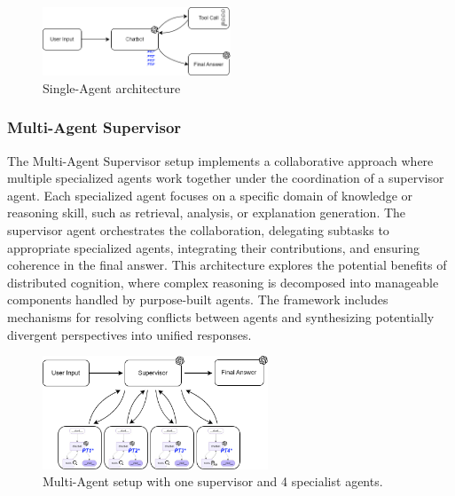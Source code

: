                 \begin{figure}[h]
                    \centering
                    \includegraphics[width=0.5\textwidth]{images_exp2/diagrams/diagrama_single_agent.png}
                    \caption{Single-Agent architecture}
                    \label{fig:diagrama_single_agent}
                \end{figure}


            \subsubsection{Multi-Agent Supervisor}

                The Multi-Agent Supervisor setup implements a collaborative approach where multiple specialized agents work together under the coordination of a supervisor agent. Each specialized agent focuses on a specific domain of knowledge or reasoning skill, such as retrieval, analysis, or explanation generation. The supervisor agent orchestrates the collaboration, delegating subtasks to appropriate specialized agents, integrating their contributions, and ensuring coherence in the final answer. This architecture explores the potential benefits of distributed cognition, where complex reasoning is decomposed into manageable components handled by purpose-built agents. The framework includes mechanisms for resolving conflicts between agents and synthesizing potentially divergent perspectives into unified responses.

                \begin{figure}[h]
                    \centering
                    \includegraphics[width=0.6\textwidth]{images_exp2/diagrams/diagrama_multiagente_supervisor.png}
                    \caption{Multi-Agent setup with one supervisor and 4 specialist agents.}
                    \label{fig:diagrama_multiagente_supervisor}
                \end{figure}


